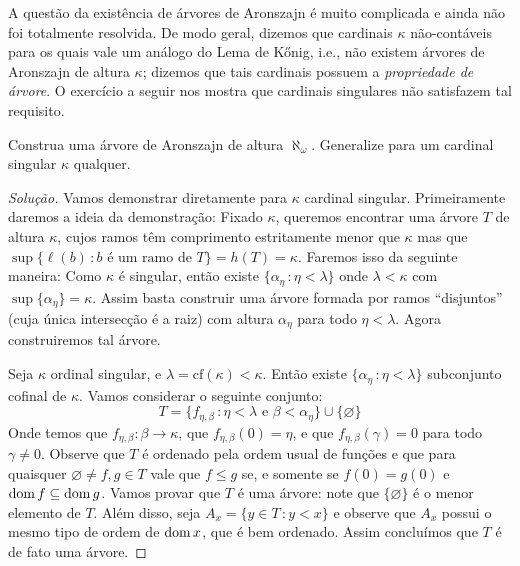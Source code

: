 \documentclass[a4paper]{article}
\begin{document}
 A questão da existência de árvores de Aronszajn é muito complicada e ainda não
 foi totalmente resolvida. De modo geral, dizemos que cardinais \(\kappa\)
 não-contáveis para os quais vale um  análogo do Lema de Kőnig, i.e., não
 existem árvores  de Aronszajn de altura \(\kappa\); dizemos que tais cardinais
 possuem a  \textit{propriedade de árvore}. O exercício a seguir nos mostra que
 cardinais singulares não satisfazem tal requisito.

 \begin{exercicio}\label{3.4}
  Construa uma árvore de Aronszajn de altura \(\aleph_{\omega}\). Generalize
  para um cardinal singular \(\kappa\) qualquer.
\end{exercicio}
\begin{proof}[Solução]
Vamos demonstrar diretamente para \(\kappa\) cardinal singular.
 Primeiramente daremos a ideia da demonstração: Fixado \(\kappa\), queremos
 encontrar uma árvore \(T\) de altura \(\kappa\), cujos ramos têm comprimento
 estritamente  menor que \(\kappa\) mas que \(\sup \{\ell(b)\,\colon b\text{ é um ramo de
 }T\}=h(T)=\kappa\). Faremos isso da seguinte maneira: Como \(\kappa\) é singular,
 então existe \(\{\alpha_\eta\,\colon\eta<\lambda\}\) onde \(\lambda<\kappa\)
 com \mbox{\(\sup\{\alpha_\eta\}=\kappa\)}. Assim basta construir uma árvore formada
 por  ramos ``disjuntos''  (cuja única intersecção é a raiz) com altura
 \(\alpha_\eta\)  para todo \(\eta<\lambda\). Agora construiremos tal árvore.
 
 Seja \(\kappa\) ordinal singular, e \(\lambda=\text{cf}(\kappa)<\kappa\). Então existe
 \(\{\alpha_\eta\,\colon \eta<\lambda\}\) subconjunto cofinal de \(\kappa\).
 Vamos considerar o seguinte
 conjunto: \[T=\big\{f_{\eta,\beta}\,\colon\eta<\lambda\text{ e
   }\beta<\alpha_{\eta}\}\cup\big\{\varnothing\big\}\]
   Onde temos que \(f_{\eta,\beta}\colon\beta\to\kappa\), que
   \(f_{\eta,\beta}(0)=\eta\), e que \(f_{\eta,\beta}(\gamma)=0\) para todo \(\gamma\neq0\). 
 Observe que \(T\) é ordenado pela ordem usual de funções e que para quaisquer
 \(\varnothing\neq f,g\in T\) vale que \(f\leq g\) se, e somente se  \(f(0)=g(0)\) e
 \(\operatorname{dom} f\subseteq\operatorname{dom} g\).
 Vamos provar que \(T\) é uma árvore: note que  \(\{\varnothing\}\) é o menor elemento de
 \(T\). Além disso, seja \mbox{\(A_x=\{y\in T\,\colon y<x\}\)} e observe que
 \(A_x\) possui o mesmo tipo de ordem de  \(\operatorname{dom} x\), que é bem ordenado. Assim
 concluímos que \(T\) é de fato uma árvore. 
 

\end{proof}
\end{document}

